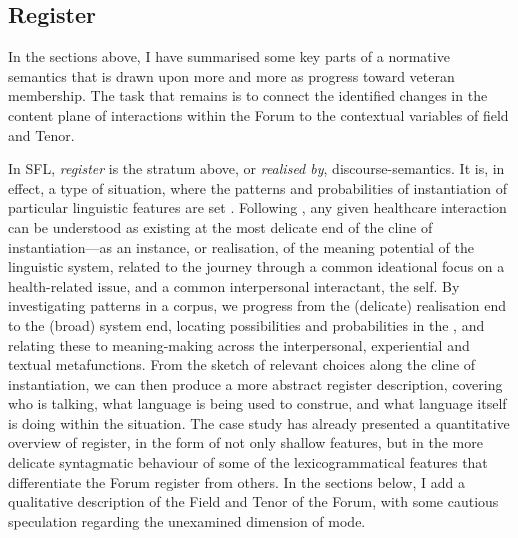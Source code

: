 \subsection{Register}

In the sections above, I have summarised some key parts of a normative semantics that is drawn upon more and more as  progress toward veteran membership. The task that remains is to connect the identified changes in the content plane of interactions within the \gls{Forum} to the contextual variables of field and Tenor.

In \gls{SFL}, \emph{register} is the stratum above, or \emph{realised by}, \glspl{discourse-semantic}. It is, in effect, a type of situation, where the patterns and probabilities of instantiation of particular linguistic features are set \cite{halliday_introduction_2004,lukin2011halliday}.
Following \textcite{matthiessen_applying_2013}, any given healthcare interaction can be understood as existing at the most delicate end of the cline of instantiation---as an instance, or realisation, of the meaning potential of the linguistic system, related to the journey through a common ideational focus on a health\hyp{}related issue, and a common interpersonal interactant, the self. By investigating patterns in a \gls{corpus}, we progress from the (delicate) realisation end to the (broad) system end, locating possibilities and probabilities in the , and relating these to meaning\hyp{}making across the interpersonal, experiential and textual metafunctions. From the sketch of relevant choices along the cline of instantiation, we can then produce a more abstract register description, covering who is talking, what language is being used to construe, and what language itself is doing within the situation. The case study has already presented a quantitative overview of register, in the form of not only shallow features, but in the more delicate syntagmatic behaviour of some of the lexicogrammatical features that differentiate the \gls{Forum} register from others. In the sections below, I add a qualitative description of the Field and Tenor of the \gls{Forum}, with some cautious speculation regarding the unexamined dimension of mode.


